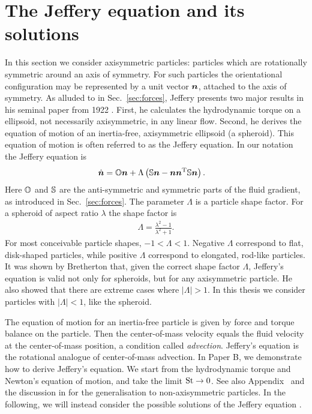 \documentclass[thesis.tex]{subfiles}
\begin{document}
\section{The Jeffery equation and its solutions}

In this section we consider axisymmetric particles: particles which are rotationally symmetric around an axis of symmetry. For such particles the orientational configuration may be represented by a unit vector $\mbox{\boldmath$n$}$, attached to the axis of symmetry. As alluded to in Sec.~\ref{sec:forces}, Jeffery presents two major results in his seminal paper from 1922 \cite{jeffery1922}. First, he calculates the hydrodynamic torque on a ellipsoid, not necessarily axisymmetric, in any linear flow. Second, he derives the equation of motion of an inertia-free, axisymmetric ellipsoid (a spheroid). This equation of motion is often referred to as the Jeffery equation. In our notation the Jeffery equation is
\begin{align}
	\dot{\ve n} &= \ma O \ve n + \Lambda \left(\ma S \ve n - \ve n \ve n \transpose \ma S \ve n\right).\eqnlab{jeffery}
\end{align}
Here $\mathbb{O}$ and $\mathbb{S}$ are the anti-symmetric and symmetric parts of the fluid gradient, as introduced in Sec.~\ref{sec:forces}. The parameter $\Lambda$ is a particle shape factor. For a spheroid of aspect ratio $\lambda$ the shape factor is
\begin{align*}
	\Lambda = \frac{\lambda^2-1}{\lambda^2+1}.
\end{align*}
For most conceivable particle shapes, $-1 < \Lambda < 1$. Negative $\Lambda$ correspond to flat, disk-shaped particles, while positive $\Lambda$ correspond to elongated, rod-like particles. It was shown by Bretherton \cite{bretherton1962} that, given the correct shape factor $\Lambda$, Jeffery's equation is valid not only for spheroids, but for any axisymmetric particle. He also showed that there are extreme cases where $|\Lambda|>1$. In this thesis we consider particles with $|\Lambda|<1$, like the spheroid.

 The equation of motion for an inertia-free particle is given by force and torque balance on the particle. Then the center-of-mass velocity equals the fluid velocity at the center-of-mass position, a condition called \emph{advection}. Jeffery's equation is the rotational analogue of center-of-mass advection. In Paper B, we demonstrate how to derive Jeffery's equation. We start from the hydrodynamic torque and Newton's equation of motion, and take the limit $\mbox{St}\to 0$. See also Appendix~ and the discussion in  for the generalisation to non-axisymmetric particles. In the following, we will instead consider the possible solutions of the Jeffery equation .
\end{document}
